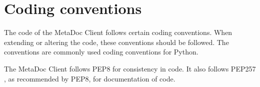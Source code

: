 \newpage
\section{Coding conventions}
\label{sec:coding_conventions}
The code of the MetaDoc Client follows certain coding conventions. When
extending or altering the code, these conventions should be followed. 
The conventions are commonly used coding conventions for Python. 

The MetaDoc Client follows PEP8 \cite{pep8} for consistency in code. It also
follows PEP257 \cite{pep257}, as recommended by PEP8, for documentation of code. 
